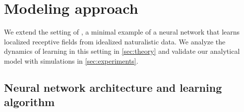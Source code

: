 \section{Modeling approach}
\label{sec:prelims}

We extend the setting of \textcite{ingrosso2022data},
a minimal example of a neural network that learns localized receptive fields 
from idealized naturalistic data.
We analyze the dynamics of learning in this setting in \cref{sec:theory}
and validate our analytical model with simulations in \cref{sec:experiments}.

\subsection{Neural network architecture and learning algorithm}
\label{sec:model}

